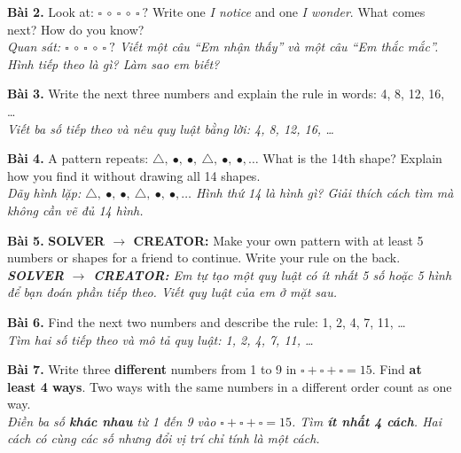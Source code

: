 \documentclass[11pt,a4paper]{article}
\newcommand{\answerline}{\noindent\dotfill\par\vspace{0.8mm}}
\begin{document}
\textbf{Bài 2.} Look at: $\square\ \circ\ \square\ \circ\ \square\ ?$ Write one \textit{I notice} and one \textit{I wonder}. What comes next? How do you know?\\
\textit{Quan sát: $\square\ \circ\ \square\ \circ\ \square\ ?$ Viết một câu ``Em nhận thấy'' và một câu ``Em thắc mắc''. Hình tiếp theo là gì? Làm sao em biết?}\\
\answerline
\answerline
\answerline

\textbf{Bài 3.} Write the next three numbers and explain the rule in words: 4, 8, 12, 16, \ldots\\
\textit{Viết ba số tiếp theo và nêu quy luật bằng lời: 4, 8, 12, 16, \ldots}\\
\answerline
\answerline

\textbf{Bài 4.} A pattern repeats: $\triangle,\ \bullet,\ \bullet,\ \triangle,\ \bullet,\ \bullet,\ldots$ What is the 14th shape? Explain how you find it without drawing all 14 shapes.\\
\textit{Dãy hình lặp: $\triangle,\ \bullet,\ \bullet,\ \triangle,\ \bullet,\ \bullet,\ldots$ Hình thứ 14 là hình gì? Giải thích cách tìm mà không cần vẽ đủ 14 hình.}\\
\answerline
\answerline

\textbf{Bài 5.} \textbf{SOLVER $\rightarrow$ CREATOR:} Make your own pattern with at least 5 numbers or shapes for a friend to continue. Write your rule on the back.\\
\textit{\textbf{SOLVER $\rightarrow$ CREATOR:} Em tự tạo một quy luật có ít nhất 5 số hoặc 5 hình để bạn đoán phần tiếp theo. Viết quy luật của em ở mặt sau.}\\
\answerline
\answerline

\textbf{Bài 6.} Find the next two numbers and describe the rule: 1, 2, 4, 7, 11, \ldots\\
\textit{Tìm hai số tiếp theo và mô tả quy luật: 1, 2, 4, 7, 11, \ldots}\\
\answerline
\answerline

\textbf{Bài 7.} Write three \textbf{different} numbers from 1 to 9 in $\square+\square+\square=15$. Find \textbf{at least 4 ways}. Two ways with the same numbers in a different order count as one way.\\
\textit{Điền ba số \textbf{khác nhau} từ 1 đến 9 vào $\square+\square+\square=15$. Tìm \textbf{ít nhất 4 cách}. Hai cách có cùng các số nhưng đổi vị trí chỉ tính là một cách.}\\
\answerline
\answerline
\end{document}

